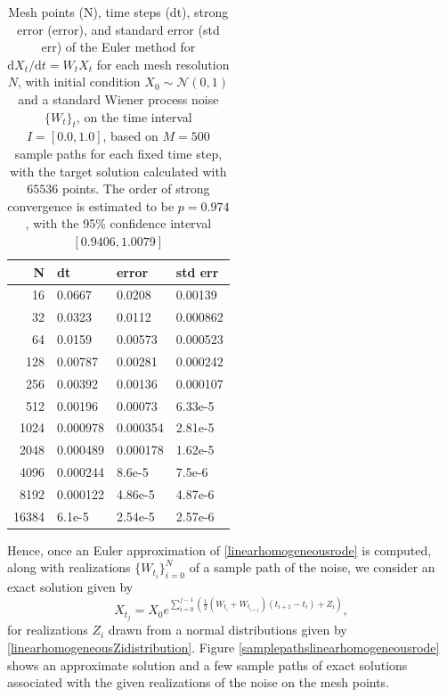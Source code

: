 \documentclass[reqno,12pt]{amsart}
\theoremstyle{plain} %
\theoremstyle{definition} %
\begin{document}
\begin{table}
    \begin{tabular}[htb]{|r|l|l|l|}
        \hline N & dt & error & std err \\
        \hline \hline
        16 & 0.0667 & 0.0208 & 0.00139 \\
        32 & 0.0323 & 0.0112 & 0.000862 \\
        64 & 0.0159 & 0.00573 & 0.000523 \\
        128 & 0.00787 & 0.00281 & 0.000242 \\
        256 & 0.00392 & 0.00136 & 0.000107 \\
        512 & 0.00196 & 0.00073 & 6.33e-5 \\
        1024 & 0.000978 & 0.000354 & 2.81e-5 \\
        2048 & 0.000489 & 0.000178 & 1.62e-5 \\
        4096 & 0.000244 & 8.6e-5 & 7.5e-6 \\
        8192 & 0.000122 & 4.86e-5 & 4.87e-6 \\
        16384 & 6.1e-5 & 2.54e-5 & 2.57e-6 \\
        \hline
    \end{tabular}
    \bigskip

    \caption{Mesh points (N), time steps (dt), strong error (error), and standard error (std err) of the Euler method for $\mathrm{d}X_t/\mathrm{d}t = W_t X_t$ for each mesh resolution $N$, with initial condition $X_0 \sim \mathcal{N}(0, 1)$ and a standard Wiener process noise $\{W_t\}_t$, on the time interval $I = [0.0, 1.0]$, based on $M = 500$ sample paths for each fixed time step, with the target solution calculated with $65536$ points. The order of strong convergence is estimated to be $p = 0.974$, with the 95\% confidence interval $[0.9406, 1.0079]$}
    \label{tablinearhomogeneousrode}
\end{table}

Hence, once an Euler approximation of \eqref{linearhomogeneousrode} is computed, along with realizations $\{W_{t_i}\}_{i=0}^N$ of a sample path of the noise, we consider an exact solution given by
\begin{equation}
    \label{Xtlinearhomogeneousrode}
    X_{t_j} = X_0 e^{\sum_{i = 0}^{j-1}\left(\frac{1}{2}\left(W_{t_i} + W_{t_{i+1}}\right)(t_{i+1} - t_i) + Z_i\right)},
\end{equation}
for realizations $Z_i$ drawn from a normal distributions given by \eqref{linearhomogeneousZidistribution}. Figure \ref{samplepathslinearhomogeneousrode} shows an approximate solution and a few sample paths of exact solutions associated with the given realizations of the noise on the mesh points.
\end{document}
